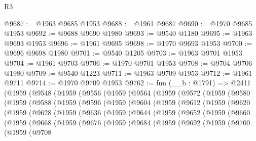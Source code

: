 \begin{lexlean}{R3}
\begin{coremodule}
@9687 := @1963 @9685 @1953
@9688 := @1961 @9687
@9690 := @1970 @9685 @1953
@9692 := @9688 @9690 @1980
@9693 := @9540 @1180
@9695 := @1963 @9693 @1953
@9696 := @1961 @9695
@9698 := @1970 @9693 @1953
@9700 := @9696 @9698 @1980
@9701 := @9540 @1205
@9703 := @1963 @9701 @1953
@9704 := @1961 @9703
@9706 := @1970 @9701 @1953
@9708 := @9704 @9706 @1980
@9709 := @9540 @1223
@9711 := @1963 @9709 @1953
@9712 := @1961 @9711
@9714 := @1970 @9709 @1953
@9762 := fun (__b : @1791) =>
  @2411
    (@1959
      (@9548
        (@1959
          (@9556
            (@1959
              (@9564
                (@1959
                  (@9572
                    (@1959
                      (@9580
                        (@1959
                          (@9588
                            (@1959
                              (@9596
                                (@1959
                                  (@9604
                                    (@1959
                                      (@9612
                                        (@1959
                                          (@9620
                                            (@1959
                                              (@9628
                                                (@1959
                                                  (@9636
                                                    (@1959
                                                      (@9644
                                                        (@1959
                                                          (@9652
                                                            (@1959
                                                              (@9660
                                                                (@1959
                                                                  (@9668
                                                                    (@1959
                                                                      (@9676
                                                                        (@1959
                                                                          (@9684
                                                                            (@1959
                                                                              (@9692
                                                                                (@1959
                                                                                  (@9700
                                                                                    (@1959
                                                                                      (@9708

\end{coremodule}
\end{lexlean}
